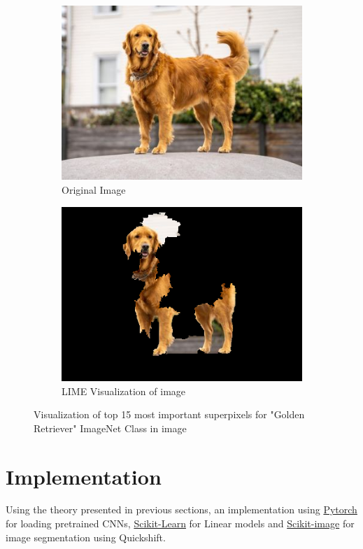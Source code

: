 \begin{figure}
    \captionsetup{justification=centering}

    \begin{subfigure}[t]{0.48\textwidth}
        \captionsetup{justification=centering}
        \centering
        \includegraphics[width=.7\linewidth]{figuras/lime/dog.jpg}
        \caption{Original Image}
    \end{subfigure}
    \hfill
    \begin{subfigure}[t]{0.48\textwidth}
        \captionsetup{justification=centering}
        \centering
        \includegraphics[width=0.5\linewidth]{figuras/lime/lime_dog_sp0.4_dk0.5_nc10.png}
        \caption{LIME Visualization of image}
    \end{subfigure}
    \caption{Visualization of top 15 most important superpixels for "Golden Retriever" ImageNet Class in image}
    \label{fig:LIME_vis_image}
\end{figure}

\section{Implementation}

Using the theory presented in previous sections, an implementation using \href{https://pytorch.org/}{Pytorch} for loading pretrained CNNs, \href{https://scikit-learn.org/stable/}{Scikit-Learn} for Linear models and \href{https://scikit-image.org/}{Scikit-image} for image segmentation using Quickshift.

